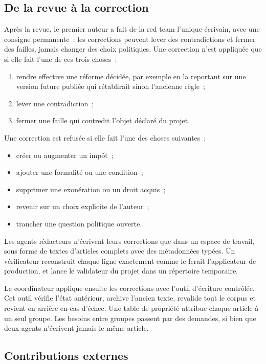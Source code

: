 \documentclass[11pt,a4paper]{article}
\begin{document}
\subsection{De la revue à la correction}

Après la revue, le premier auteur a fait de la red team l'unique écrivain, avec une consigne permanente~: les corrections peuvent lever des contradictions et fermer des failles, jamais changer des choix politiques. Une correction n'est appliquée que si elle fait l'une de ces trois choses~:
\begin{enumerate}[label=(\alph*)]
  \item rendre effective une réforme décidée, par exemple en la reportant sur une version future publiée qui rétablirait sinon l'ancienne règle~;
  \item lever une contradiction~;
  \item fermer une faille qui contredit l'objet déclaré du projet.
\end{enumerate}
Une correction est refusée si elle fait l'une des choses suivantes~:
\begin{itemize}
  \item créer ou augmenter un impôt~;
  \item ajouter une formalité ou une condition~;
  \item supprimer une exonération ou un droit acquis~;
  \item revenir sur un choix explicite de l'auteur~;
  \item trancher une question politique ouverte.
\end{itemize}

Les agents rédacteurs n'écrivent leurs corrections que dans un espace de travail, sous forme de textes d'articles complets avec des métadonnées typées. Un vérificateur reconstruit chaque ligne exactement comme le ferait l'applicateur de production, et lance le validateur du projet dans un répertoire temporaire.

Le coordinateur applique ensuite les corrections avec l'outil d'écriture contrôlée. Cet outil vérifie l'état antérieur, archive l'ancien texte, revalide tout le corpus et revient en arrière en cas d'échec. Une table de propriété attribue chaque article à un seul groupe. Les besoins entre groupes passent par des demandes, si bien que deux agents n'écrivent jamais le même article.

\subsection{Contributions externes}
\end{document}
